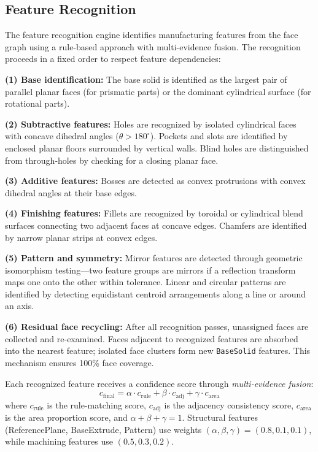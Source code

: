 \documentclass{styles/svproc}
\begin{document}
\subsection{Feature Recognition}
\label{sec:features}
The feature recognition engine identifies manufacturing features from the face graph using a rule-based approach with multi-evidence fusion. The recognition proceeds in a fixed order to respect feature dependencies:

\textbf{(1) Base identification:} The base solid is identified as the largest pair of parallel planar faces (for prismatic parts) or the dominant cylindrical surface (for rotational parts).

\textbf{(2) Subtractive features:} Holes are recognized by isolated cylindrical faces with concave dihedral angles ($\theta > 180^{\circ}$). Pockets and slots are identified by enclosed planar floors surrounded by vertical walls. Blind holes are distinguished from through-holes by checking for a closing planar face.

\textbf{(3) Additive features:} Bosses are detected as convex protrusions with convex dihedral angles at their base edges.

\textbf{(4) Finishing features:} Fillets are recognized by toroidal or cylindrical blend surfaces connecting two adjacent faces at concave edges. Chamfers are identified by narrow planar strips at convex edges.

\textbf{(5) Pattern and symmetry:} Mirror features are detected through geometric isomorphism testing---two feature groups are mirrors if a reflection transform maps one onto the other within tolerance. Linear and circular patterns are identified by detecting equidistant centroid arrangements along a line or around an axis.

\textbf{(6) Residual face recycling:} After all recognition passes, unassigned faces are collected and re-examined. Faces adjacent to recognized features are absorbed into the nearest feature; isolated face clusters form new \texttt{BaseSolid} features. This mechanism ensures 100\% face coverage.

Each recognized feature receives a confidence score through \emph{multi-evidence fusion}:
\begin{equation}
c_{\text{final}} = \alpha \cdot c_{\text{rule}} + \beta \cdot c_{\text{adj}} + \gamma \cdot c_{\text{area}}
\label{eq:confidence}
\end{equation}
where $c_{\text{rule}}$ is the rule-matching score, $c_{\text{adj}}$ is the adjacency consistency score, $c_{\text{area}}$ is the area proportion score, and $\alpha + \beta + \gamma = 1$. Structural features (ReferencePlane, BaseExtrude, Pattern) use weights $(\alpha, \beta, \gamma) = (0.8, 0.1, 0.1)$, while machining features use $(0.5, 0.3, 0.2)$.
\end{document}
